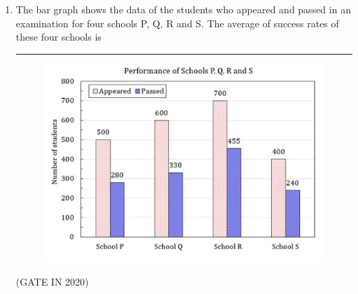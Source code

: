 \documentclass[journal,12pt,onecolumn]{IEEEtran}
\theoremstyle{remark}
\begin{document}
\begin{enumerate}
\begin{enumerate}
\end{enumerate}

\item The bar graph shows the data of the students who appeared and passed in an examination for four schools P, Q, R and S. The average of success rates  of these four schools is \rule{2cm}{0.4pt}

\begin{figure}[H]
\centering
\includegraphics[width=0.7\columnwidth]{figs/q5.jpg}
\caption*{}
\label{fig:q5}
\end{figure}

\hfill{(GATE IN 2020)}
\begin{enumerate}
\end{enumerate}

\end{enumerate}
\end{document}
